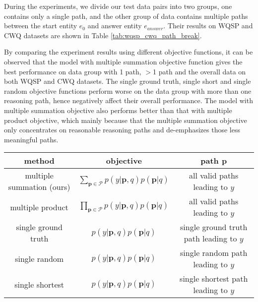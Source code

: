 

During the experiments, we divide our test data pairs into two groups, one contains only a single path, and the other group of data contains multiple paths between the start entity $e_0$ and answer entity $e_{answer}$. Their results on WQSP and CWQ datasets are shown in Table \ref{tab:wqsp_cwq_path_break}. 

By comparing the experiment results using different objective functions, it can be observed that the model with multiple summation objective function gives the best performance on data group with 1 path, $>$1 path and the overall data on both WQSP and CWQ datasets. The single ground truth, single short and single random objective functions perform worse on the data group with more than one reasoning path, hence negatively affect their overall performance. The model with multiple summation objective also performs better than that with multiple product objective, which mainly because that the multiple summation objective only concentrates on reasonable reasoning paths and de-emphasizes those less meaningful paths.

\begin{table*}[h]
    \centering
    \begin{tabular}{|c|c|c|}
    \hline
    method & objective & path $\mathbf{p}$ \\
    \hline
         multiple summation (ours)&  $\sum_{\mathbf{p}\in\mathcal{P}} p(y|\mathbf{p},q)p(\mathbf{p}|q)$ & all valid paths leading to $y$\\
         \hline
               multiple product&  $\prod_{\mathbf{p}\in\mathcal{P}} p(y|\mathbf{p},q)p(\mathbf{p}|q)$ & all valid paths leading to $y$\\
               \hline
          single ground truth&  $ p(y|\mathbf{p},q)p(\mathbf{p}|q)$ & single ground truth path leading to $y$\\
        \hline
        single random&  $ p(y|\mathbf{p},q)p(\mathbf{p}|q)$ & single random path leading to $y$\\
        \hline
        single shortest&  $ p(y|\mathbf{p},q)p(\mathbf{p}|q)$ & single shortest path leading to $y$\\
         \hline
    \end{tabular}
    \caption{} 
    \label{tab:obj_fcn}
\end{table*}


